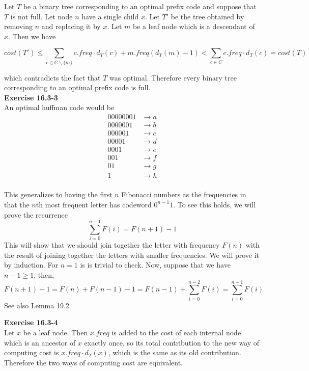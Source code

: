 \documentclass{article}
\begin{document}
Let $T$ be a binary tree corresponding to an optimal prefix code and suppose that $T$ is not full.  Let node $n$ have a single child $x$.  Let $T'$ be the tree obtained by removing $n$ and replacing it by $x$.  Let $m$ be a leaf node which is a descendant of $x$.  Then we have

\[ cost(T') \leq \sum_{c \in C \backslash \{m\} } c.freq \cdot d_{T}(c) + m.freq(d_T(m) - 1) < \sum_{c \in C} c.freq \cdot d_{T}(c) = cost(T)\]

which contradicts the fact that $T$ was optimal.  Therefore every binary tree corresponding to an optimal prefix code is full.\\


\noindent\textbf{Exercise 16.3-3}\\

An optimal huffman code would be 
\begin{align*}
00000001 &\rightarrow a\\
0000001 &\rightarrow b\\
000001 &\rightarrow c\\
00001 &\rightarrow d\\
0001 &\rightarrow e\\
001 &\rightarrow f\\
01 &\rightarrow g\\
1 &\rightarrow h\\
\end{align*}

This generalizes to having the first $n$ Fibonacci numbers as the frequencies in that the $n$th most frequent letter has codeword $0^{n-1}1$. To see this holds, we will prove the recurrence 
\[
\sum_{i=0}^{n-1} F(i) = F(n+1)-1
\]
This will show that we should join together the letter with frequency $F(n)$ with the result of joining together the letters with smaller frequencies. We will prove it by induction. For $n=1$ is is trivial to check. Now, suppose that we have $n-1\ge1$, then, 
\[
F(n+1) - 1 = F(n) + F(n-1) -1 = F(n-1) + \sum_{i=0}^{n-2} F(i) = \sum_{i=0}^{n-1} F(i)
\]
See also Lemma 19.2.

\noindent\textbf{Exercise 16.3-4}\\

Let $x$ be a leaf node.  Then $x.freq$ is added to the cost of each internal node which is an ancestor of $x$ exactly once, so its total contribution to the new way of computing cost is $x.freq\cdot d_T(x)$, which is the same as its old contribution.  Therefore the two ways of computing cost are equivalent. \\
\end{document}

